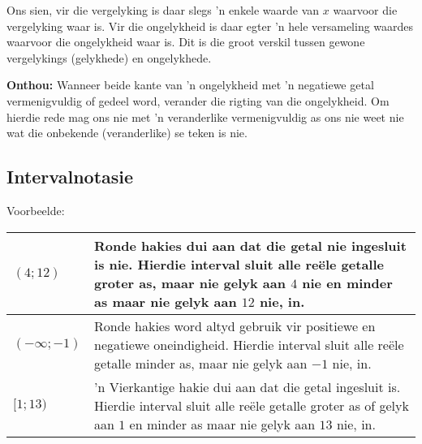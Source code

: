 Ons sien, vir die vergelyking is daar slegs ’n enkele waarde van  $x$ waarvoor die vergelyking waar is. Vir
die ongelykheid is daar egter ’n hele versameling waardes waarvoor die ongelykheid waar is. Dit is die groot
verskil tussen gewone vergelykings (gelykhede) en ongelykhede.\par 

\textbf{Onthou: } Wanneer beide kante van ’n ongelykheid met ’n negatiewe getal vermenigvuldig of gedeel word, verander die rigting van
die ongelykheid. Om hierdie rede mag ons nie met ’n veranderlike vermenigvuldig as
ons nie weet nie wat die onbekende (veranderlike) se teken is nie.\par
{}

\subsection*{Intervalnotasie}
Voorbeelde:
\\
\begin{table}[H]
\begin{tabular}{|p{5cm}|p{8cm}|}
\hline
  $(4;12)$ &  Ronde hakies dui aan dat die getal nie ingesluit is nie. Hierdie interval sluit alle reële getalle groter as, maar nie gelyk aan $4$ nie en minder as maar nie gelyk aan $12$ nie, in.
\\ \hline
 $(- \infty; -1)$ & Ronde hakies word altyd gebruik vir positiewe en negatiewe oneindigheid. Hierdie interval sluit alle reële getalle minder as, maar nie gelyk aan $-1$ nie, in.
\\ \hline
 $[1; 13)$ & 'n Vierkantige hakie dui aan dat die getal ingesluit is. Hierdie interval sluit alle reële getalle groter as of gelyk aan $1$ en minder as maar nie gelyk aan $13$ nie, in.
\\ \hline
\end{tabular}
\end{table}

